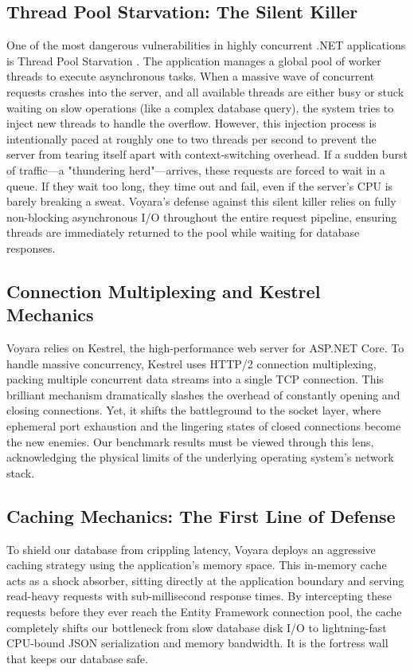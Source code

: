 \subsection{Thread Pool Starvation: The Silent Killer}
One of the most dangerous vulnerabilities in highly concurrent .NET applications is Thread Pool Starvation \cite{thread_pool_starvation}. The application manages a global pool of worker threads to execute asynchronous tasks. When a massive wave of concurrent requests crashes into the server, and all available threads are either busy or stuck waiting on slow operations (like a complex database query), the system tries to inject new threads to handle the overflow. 
However, this injection process is intentionally paced at roughly one to two threads per second to prevent the server from tearing itself apart with context-switching overhead. If a sudden burst of traffic—a "thundering herd"—arrives, these requests are forced to wait in a queue. If they wait too long, they time out and fail, even if the server's CPU is barely breaking a sweat. Voyara's defense against this silent killer relies on fully non-blocking asynchronous I/O throughout the entire request pipeline, ensuring threads are immediately returned to the pool while waiting for database responses.

\subsection{Connection Multiplexing and Kestrel Mechanics}
Voyara relies on Kestrel, the high-performance web server for ASP.NET Core. To handle massive concurrency, Kestrel uses HTTP/2 connection multiplexing, packing multiple concurrent data streams into a single TCP connection. This brilliant mechanism dramatically slashes the overhead of constantly opening and closing connections. Yet, it shifts the battleground to the socket layer, where ephemeral port exhaustion and the lingering states of closed connections become the new enemies. Our benchmark results must be viewed through this lens, acknowledging the physical limits of the underlying operating system's network stack.

\subsection{Caching Mechanics: The First Line of Defense}
To shield our database from crippling latency, Voyara deploys an aggressive caching strategy using the application's memory space. This in-memory cache acts as a shock absorber, sitting directly at the application boundary and serving read-heavy requests with sub-millisecond response times. By intercepting these requests before they ever reach the Entity Framework connection pool, the cache completely shifts our bottleneck from slow database disk I/O to lightning-fast CPU-bound JSON serialization and memory bandwidth. It is the fortress wall that keeps our database safe.

